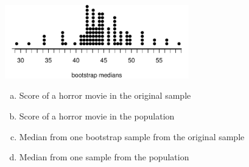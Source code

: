 \documentclass[11pt,containsverbatim,handout,xcolor=xelatex,dvipsnames,table]{beamer}
\newcommand{\solnMult}[1]{#1}
\begin{document}

\begin{frame}
\frametitle{}


\begin{center}
\includegraphics[width = 0.6\textwidth]{figures/movies/horror_boot_med_dot}
\end{center}

\begin{enumerate}[(a)]
\item Score of a horror movie in the original sample
\item Score of a horror movie in the population
\item \solnMult{Median from one bootstrap sample from the original sample}
\item Median from one sample from the population
\end{enumerate}

\end{frame}

\end{document}
